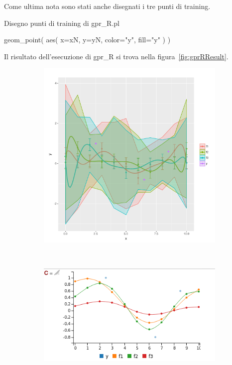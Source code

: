 \documentclass[10pt,titlepage,twoside,a4paper]{report}
\newenvironment{code}{\singlespacing\captionsetup{type=listing}}{}
\begin{document}
Come ultima nota sono stati anche disegnati i tre punti di training.
\begin{code}
\caption{Disegno punti di training di gpr\_R.pl}
\begin{rcode*}{}
geom_point(
    aes(
        x=xN,
        y=yN,
        color="y",
        fill="y"
    )
)
\end{rcode*}
\end{code}

Il risultato dell'esecuzione di gpr\_R si trova nella 
figura~\ref{fig:gprRResult}.

\begin{figure}[H]
\caption{Risultato di \texttt{draw\_fun\_pred(sq\_exp\_p)} di gpr.pl}
\label{fig:gprRResult}
    \begin{subfigure}[b]{0.5\textwidth}
        \includegraphics[width=1.0\linewidth]{gpr_R_plot.png}
    \end{subfigure}~\begin{subfigure}[b]{0.5\textwidth}
        \includegraphics[width=1.0\linewidth]{gpr_plot.png}
    \end{subfigure}
\end{figure}
\end{document}
